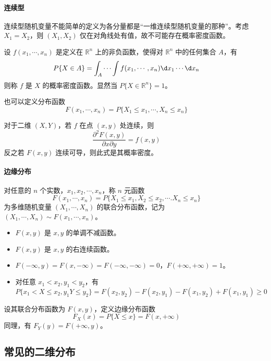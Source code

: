 \paragraph{连续型}
连续型随机变量不能简单的定义为各分量都是“一维连续型随机变量的那种”。考虑 $X_1 = X_2$，则 $(X_1, X_2)$ 仅在对角线处有值，故不可能存在概率密度函数。

\begin{definition}
	设 $f(x_1, \cdots, x_n)$ 是定义在 $\mathbb{R}^n$ 上的非负函数，使得对 $\mathbb{R}^n$ 中的任何集合 $A$，有
	\[ P\{X \in A\} = \int_A \cdots \int f(x_1, \cdots, x_n) \d x_1 \cdots \d x_n \]
	则称 $f$ 是 $X$ 的概率密度函数。显然当 $P\{ X \in \mathbb{R}^n\} = 1$。
\end{definition}

也可以定义分布函数
\[ F(x_1, \cdots, x_n) = P\{X_1 \leqslant x_1, \cdots, X_n \leqslant x_n \} \]

对于二维 $(X, Y)$，若 $f$ 在点 $(x, y)$ 处连续，则
\[ \frac{\partial^2 F(x, y)}{\partial x \partial y} = f(x, y) \]
反之若 $F(x, y)$ 连续可导，则此式是其概率密度。

\paragraph{边缘分布}

对任意的 $n$ 个实数，$x_1, x_2, \cdots, x_n$，称 $n$ 元函数
\[ F(x_1, \cdots, x_n) = P\{X_1 \leqslant x_1, X_2 \leqslant x_2, \cdots. X_n \leqslant x_n\} \]
为多维随机变量 $(X_1, \cdots, X_n)$ 的联合分布函数，记为 $(X_1, \cdots, X_n) \sim F(x_1, \cdots, x_n)$。

\begin{itemize}
	\item $F(x, y)$ 是 $x, y$ 的单调不减函数。
	\item $F(x, y)$ 是 $x, y$ 的右连续函数。
	\item $F(-\infty, y) = F(x, -\infty) = F(-\infty, -\infty) = 0$，$F(+\infty, +\infty) = 1$。
	\item 对任意 $x_1 < x_2, y_1 < y_2$，有
	      \[ P\{x_1 < X \leqslant x_2, y_1 Y \leqslant y_2\} = F(x_2, y_2) - F(x_2, y_1) - F(x_1, y_2) + F(x_1, y_1) \geqslant 0 \]
\end{itemize}

设其联合分布函数为 $F(x,y)$，定义边缘分布函数
\[ F_X(x) = P\{X \leqslant x\} = F(x, +\infty) \]
同理，有 $F_Y(y) = F(+\infty, y)$。


\subsection{常见的二维分布}

